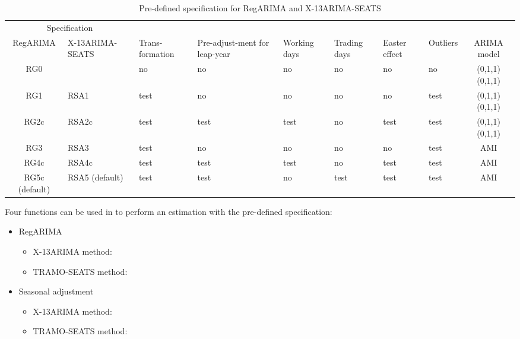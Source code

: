 \documentclass[article]{jss}
\providecommand{\tightlist}{%
  \setlength{\itemsep}{0pt}\setlength{\parskip}{0pt}}
\begin{document}
\begin{table}

\caption{\label{tab:pre_def_x13}Pre-defined specification for RegARIMA and X-13ARIMA-SEATS}
\centering
\fontsize{7}{9}\selectfont
\begin{tabular}[t]{c>{\centering\arraybackslash}p{1.7cm}>{\centering\arraybackslash}p{}>{\centering\arraybackslash}p{1.4cm}>{\centering\arraybackslash}p{0.9cm}>{\centering\arraybackslash}p{0.9cm}>{\centering\arraybackslash}p{0.9cm}>{\centering\arraybackslash}p{0.9cm}c}
\toprule
\multicolumn{2}{c}{Specification} & \multicolumn{1}{c}{} \\
\cmidrule(l{2pt}r{2pt}){1-2}
RegARIMA & X-13ARIMA-SEATS & Trans-formation & Pre-adjust-ment for leap-year & Working days & Trading days & Easter effect & Outliers & ARIMA model\\
\midrule
RG0 &  & no & no & no & no & no & no & (0,1,1)(0,1,1)\\
RG1 & RSA1 & test & no & no & no & no & test & (0,1,1)(0,1,1)\\
RG2c & RSA2c & test & test & test & no & test & test & (0,1,1)(0,1,1)\\
RG3 & RSA3 & test & no & no & no & no & test & AMI\\
RG4c & RSA4c & test & test & test & no & test & test & AMI\\
RG5c (default) & RSA5 (default) & test & test & no & test & test & test & AMI\\
\bottomrule
\end{tabular}
\end{table}

Four functions can be used in  to perform an estimation
with the pre-defined specification:

\begin{itemize}
\tightlist
\item
  RegARIMA

  \begin{itemize}
  \tightlist
  \item
    X-13ARIMA method: 
  \item
    TRAMO-SEATS method: 
  \end{itemize}
\item
  Seasonal adjustment

  \begin{itemize}
  \tightlist
  \item
    X-13ARIMA method: 
  \item
    TRAMO-SEATS method: 
  \end{itemize}
\end{itemize}
\end{document}
